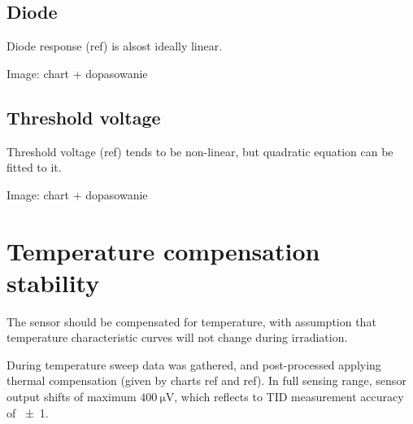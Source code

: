     \subsection{Diode}
        Diode response (ref) is alsost ideally linear.

        Image: chart + dopasowanie

    \subsection{Threshold voltage}
        Threshold voltage (ref) tends to be non-linear, but quadratic equation can be fitted to it.

        Image: chart + dopasowanie


\section{Temperature compensation stability}
    The sensor should be compensated for temperature, with assumption that temperature characteristic curves will not change during irradiation.

    During temperature sweep data was gathered, and post-processed applying thermal compensation (given by charts ref and ref). In full sensing range, sensor output shifts of maximum $\SI{400}{\uV}$, which reflects to TID measurement accuracy of \SI{\pm 1}{\rad}.



    
